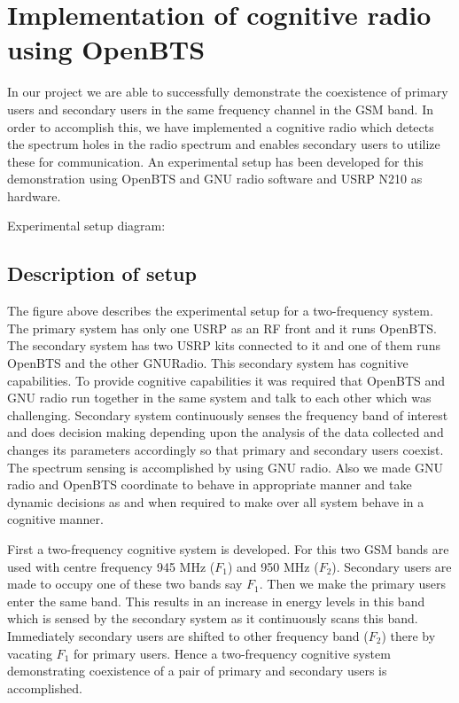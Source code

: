 \chapter{Implementation of cognitive radio using OpenBTS}

In our project we are able to successfully demonstrate the
coexistence of primary users and secondary users in the same 
frequency channel in the
GSM band. In order to accomplish this, we have implemented
a cognitive radio which detects the spectrum holes in the
radio spectrum and enables secondary users to utilize these 
for communication. An experimental setup has been  
developed for this demonstration using OpenBTS and GNU 
radio software and USRP N210 as hardware.

Experimental setup diagram:


\section{Description of setup}
The figure above describes the experimental setup for a
two-frequency system. The primary system has only
one USRP as an RF front and it runs OpenBTS. The 
secondary system has two USRP kits connected to it and one of them
runs OpenBTS and the other GNURadio.
This secondary system has cognitive capabilities. 
To provide cognitive capabilities it was required that 
OpenBTS and GNU radio run together in the same system and 
talk to each other which was challenging. Secondary system
continuously senses the frequency band of interest and does 
decision making depending upon the analysis of the data 
collected and changes its parameters accordingly so that 
primary and secondary users coexist. The spectrum sensing 
is accomplished by using GNU radio. Also we made GNU radio 
and OpenBTS coordinate to behave in appropriate manner and 
take dynamic decisions as and when required to make over all
system behave in a cognitive manner.

First a two-frequency cognitive system is developed.
For this two GSM bands are used with centre frequency
945 MHz ($F_1$) and 950 MHz ($F_2$). Secondary users are made to occupy
one of these two bands say $F_1$. Then we make the primary users 
enter the same band. This results in an increase in energy 
levels in this band which is sensed by the secondary system 
as it continuously scans this band. Immediately
secondary users are shifted to other frequency band ($F_2$)
there by vacating $F_1$ for primary users. Hence a two-frequency
cognitive system demonstrating coexistence of a pair of
primary and secondary users is accomplished. 

